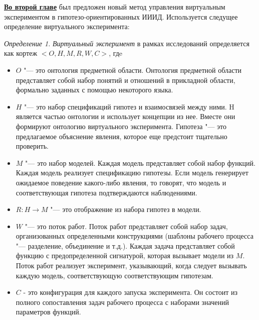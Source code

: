 \underline{\textbf{Во второй главе}} был предложен новый метод управления виртуальным экспериментом 
в гипотезо-ориентированных ИИИД. Используется следущее определение виртуального эксперимента:

 \textit{Определение 1.} \textit{Виртуальный эксперимент} в рамках исследований определяется как 
кортеж $<O, H, M, R, W, C>$, гдe
\begin{itemize}
    \item $O$ "--- это онтология предметной области. Онтология предметной области представляет собой набор понятий и 
            отношений в прикладной области, формально заданных с помощью некоторого языка.
    \item $H$ "--- это набор спецификаций гипотез и взаимосвязей между ними. H является частью онтологии и использует 
            концепции из нее. Вместе они формируют онтологию виртуального эксперимента. Гипотеза "--- это предлагаемое 
            объяснение явления, которое еще предстоит тщательно проверить. 
    \item $M$ "--- это набор моделей. Каждая модель представляет собой набор функций. Каждая модель реализует 
            спецификацию гипотезы. Если модель генерирует ожидаемое поведение какого-либо явления, то говорят, что 
            модель и соответствующая гипотеза подтверждаются наблюдениями.
    \item $R: H \to M$ "--- это отображение из набора гипотез в модели.
    \item $W$ "--- это поток работ. Поток работ представляет собой набор задач, организованных определенными 
            конструкциями (шаблоны рабочего процесса "--- разделение, объединение и т.д.). Каждая задача представляет 
            собой функцию с предопределенной сигнатурой, которая вызывает модели из $M$. Поток работ реализует 
            эксперимент, указывающий, когда следует вызывать каждую модель, соответствующую соответствующим гипотезам. 
    \item $C$ - это конфигурация для каждого запуска эксперимента. Он состоит из полного сопоставления задач 
            рабочего процесса с наборами значений параметров функций.
\end{itemize}

